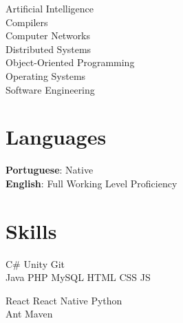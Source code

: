 \documentclass[a4paper]{deedy-resume} %
\begin{document}
\begin{minipage}[t]{0.33\textwidth}
Artificial Intelligence\\
Compilers\\
Computer Networks\\
Distributed Systems\\
Object-Oriented Programming\\
Operating Systems\\
Software Engineering\\
\sectionspace %



\section{Languages} 
\textbf{Portuguese}: Native\\
\textbf{English}: Full Working Level Proficiency\\

\sectionspace %


\section{Skills}


C\# \textbullet{} Unity \textbullet{} Git\\

Java \textbullet{} PHP \textbullet{} MySQL \textbullet{} HTML \textbullet{} CSS \textbullet{} JS

React \textbullet{} React Native \textbullet{} Python\\
Ant \textbullet{} Maven\\


\sectionspace %

\end{minipage} %
\hfill
%
\end{document}
